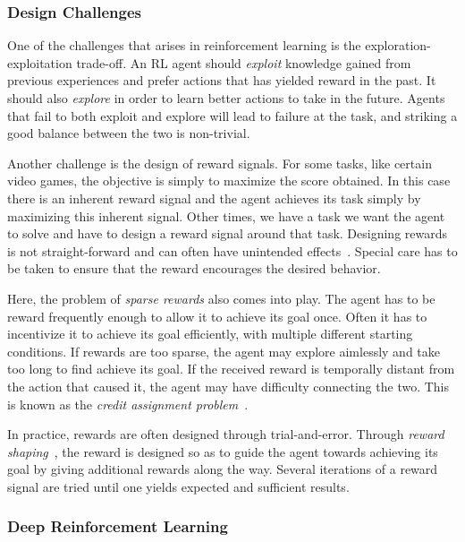 \subsubsection{Design Challenges}


One of the challenges that arises in reinforcement learning is the exploration-exploitation trade-off.
An RL agent should \textit{exploit} knowledge gained from previous experiences and prefer actions that has yielded reward in the past.
It should also \textit{explore} in order to learn better actions to take in the future.
Agents that fail to both exploit and explore will lead to failure at the task, and striking a good balance between the two is non-trivial.~\cite{sutton_reinforcement_2018}

Another challenge is the design of reward signals.
For some tasks, like certain video games, the objective is simply to maximize the score obtained.
In this case there is an inherent reward signal and the agent achieves its task simply by maximizing this inherent signal.
Other times, we have a task we want the agent to solve and have to design a reward signal around that task.
Designing rewards is not straight-forward and can often have unintended effects~\cite{sutton_reinforcement_2018}.
Special care has to be taken to ensure that the reward encourages the desired behavior.

Here, the problem of \textit{sparse rewards} also comes into play.
The agent has to be reward frequently enough to allow it to achieve its goal once.
Often it has to incentivize it to achieve its goal efficiently, with multiple different starting conditions.
If rewards are too sparse, the agent may explore aimlessly and take too long to find achieve its goal.
If the received reward is temporally distant from the action that caused it, the agent may have difficulty connecting the two.
This is known as the \textit{credit assignment problem}~\cite{minsky_cap_1961}.

In practice, rewards are often designed through trial-and-error.
Through \textit{reward shaping}~\cite{mataric_shaping_1994},
the reward is designed so as to guide the agent towards achieving its goal by giving additional rewards along the way.
Several iterations of a reward signal are tried until one yields expected and sufficient results.

\subsubsection{Deep Reinforcement Learning}

